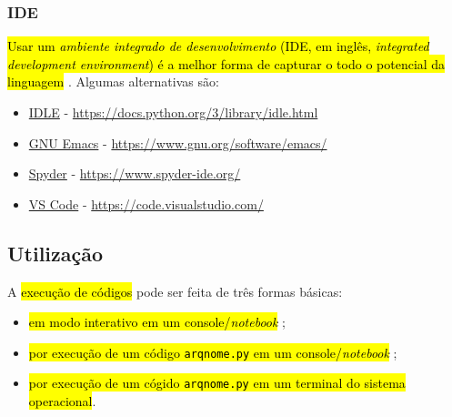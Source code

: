 \subsubsection{IDE}

\hl{Usar um \emph{ambiente integrado de desenvolvimento} (IDE, em inglês, \textit{integrated development environment}) é a melhor forma de capturar o todo o potencial da linguagem {\python}}. Algumas alternativas são:
\begin{itemize}
\item \href{https://docs.python.org/3/library/idle.html}{IDLE} - \url{https://docs.python.org/3/library/idle.html}
\item \href{https://www.gnu.org/software/emacs/download.html}{GNU Emacs} - \url{https://www.gnu.org/software/emacs/}
\item \href{https://www.spyder-ide.org/}{Spyder} - \url{https://www.spyder-ide.org/}
\item \href{https://code.visualstudio.com/}{VS Code} - \url{https://code.visualstudio.com/}
\end{itemize}

\subsection{Utilização}

A \hl{execução de códigos {\python}} pode ser feita de três formas básicas:
\begin{itemize}
\item \hl{em modo interativo em um console/\textit{notebook} {\python}};
\item \hl{por execução de um código \texttt{arqnome.py} em um console/\textit{notebook} {\python}};
\item \hl{por execução de um cógido \texttt{arqnome.py} em um terminal do sistema operacional}.
\end{itemize}

